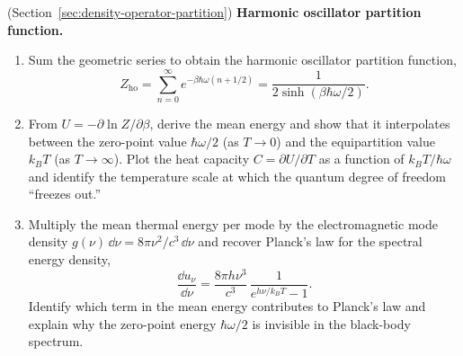 \begin{problemset}
\item (Section~\ref{sec:density-operator-partition}) \textbf{Harmonic oscillator partition function.}
    \begin{enumerate}
        \item[(a)] Sum the geometric series to obtain the harmonic oscillator partition function,
        \begin{equation*}
            Z_{\text{ho}} = \sum_{n=0}^\infty e^{-\beta\hbar\omega(n + 1/2)}
                          = \frac{1}{2\sinh(\beta\hbar\omega/2)}.
        \end{equation*}
        \item[(b)] From $U = -\partial\ln Z/\partial\beta$, derive the mean energy and show that it interpolates between the zero-point value $\hbar\omega/2$ (as $T \to 0$) and the equipartition value $k_B T$ (as $T \to \infty$). Plot the heat capacity $C = \partial U/\partial T$ as a function of $k_B T/\hbar\omega$ and identify the temperature scale at which the quantum degree of freedom ``freezes out.''
        \item[(c)] Multiply the mean thermal energy per mode by the electromagnetic mode density $g(\nu)\,\dd\nu = 8\pi\nu^2/c^3\,\dd\nu$ and recover Planck's law for the spectral energy density,
        \begin{equation*}
            \frac{\dd u_\nu}{\dd\nu} = \frac{8\pi h\nu^3}{c^3}\,\frac{1}{e^{h\nu/k_B T} - 1}.
        \end{equation*}
        Identify which term in the mean energy contributes to Planck's law and explain why the zero-point energy $\hbar\omega/2$ is invisible in the black-body spectrum.
    \end{enumerate}

\end{problemset}
